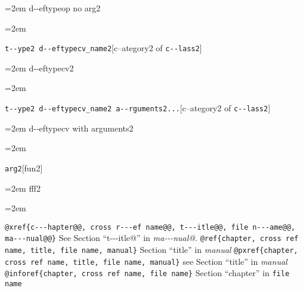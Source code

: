 \documentclass{book}
\begin{document}
%
\par\begingroup\obeylines\obeyspaces\frenchspacing\leftskip=2em\relax\parskip=0pt\relax\ttfamily{}%
d{-}{-}eftypeop no arg2
\endgroup{}%
\par\begingroup\obeylines\obeyspaces\frenchspacing\leftskip=2em\relax\parskip=0pt\relax\ttfamily{}%

\endgroup{}%
\noindent\texttt{t{-}{-}ype2 d{-}{-}eftypecv\_name2}\hfill[c--ategory2 of \texttt{c{-}{-}lass2}]



%
\par\begingroup\obeylines\obeyspaces\frenchspacing\leftskip=2em\relax\parskip=0pt\relax\ttfamily{}%
d{-}{-}eftypecv2
\endgroup{}%
\par\begingroup\obeylines\obeyspaces\frenchspacing\leftskip=2em\relax\parskip=0pt\relax\ttfamily{}%

\endgroup{}%
\noindent\texttt{t{-}{-}ype2 d{-}{-}eftypecv\_name2 a{-}{-}rguments2...}\hfill[c--ategory2 of \texttt{c{-}{-}lass2}]



%
\par\begingroup\obeylines\obeyspaces\frenchspacing\leftskip=2em\relax\parskip=0pt\relax\ttfamily{}%
d{-}{-}eftypecv with arguments2
\endgroup{}%
\par\begingroup\obeylines\obeyspaces\frenchspacing\leftskip=2em\relax\parskip=0pt\relax\ttfamily{}%

\endgroup{}%
\noindent\texttt{arg2}\hfill[fun2]



%
\par\begingroup\obeylines\obeyspaces\frenchspacing\leftskip=2em\relax\parskip=0pt\relax\ttfamily{}%
fff2
\endgroup{}%
\par\begingroup\obeylines\obeyspaces\frenchspacing\leftskip=2em\relax\parskip=0pt\relax\ttfamily{}%


\texttt{@xref\{c{-}{-}{-}hapter@@, cross r{-}{-}{-}ef name@@, t{-}{-}{-}itle@@, file n{-}{-}{-}ame@@, ma{-}{-}{-}nual@@\}} See Section ``t{-}{-}{-}itle@'' in \textsl{ma{-}{-}{-}nual@}.
\texttt{@ref\{chapter, cross ref name, title, file name, manual\}} Section ``title'' in \textsl{manual}
\texttt{@pxref\{chapter, cross ref name, title, file name, manual\}} see Section ``title'' in \textsl{manual}
\texttt{@inforef\{chapter, cross ref name, file name\}} Section ``chapter'' in \texttt{file name}
\end{document}
